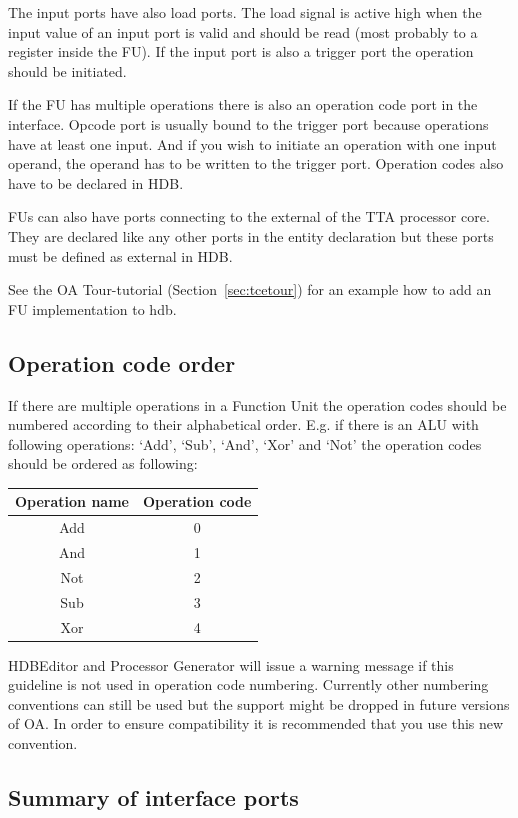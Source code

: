 \documentclass[a4paper,twoside]{tceusermanual}
\begin{document}
The input ports have also load ports. The load signal is active high when the
input value of an input port is valid and should be read (most probably to a
register inside the FU). If the input port is also a trigger port the
operation should be initiated.

If the FU has multiple operations there is also an operation code port in the
interface. Opcode port is usually bound to the trigger port because operations
have at least one input. And if you wish to initiate an operation with one
input operand, the operand has to be written to the trigger port. Operation
codes also have to be declared in HDB.

FUs can also have ports connecting to the external of the TTA processor
core. They are declared like any other ports in the entity declaration but
these ports must be defined as external in HDB.

See the OA Tour-tutorial (Section~\ref{sec:tcetour}) for an example how to
add an FU implementation to hdb.

\subsection{Operation code order}
\label{sec:opcodeorder}
If there are multiple operations in a Function Unit the operation codes
should be numbered according to their alphabetical order. E.g. if there is
an ALU with following operations: `Add', `Sub', `And', `Xor' and `Not' the
operation codes should be ordered as following:

\begin{tabular}{|c|c|}
 \hline
 Operation name & Operation code \\ \hline
 Add & 0 \\ \hline
 And & 1 \\ \hline
 Not & 2 \\ \hline
 Sub & 3 \\ \hline
 Xor & 4 \\ \hline
\end{tabular}

HDBEditor and Processor Generator will issue a warning message if this
guideline is not used in operation code numbering. Currently other
numbering conventions can still be used but the support might be dropped
in future versions of OA. In order to ensure compatibility it is recommended
that you use this new convention.


\subsection{Summary of interface ports}
\end{document}
